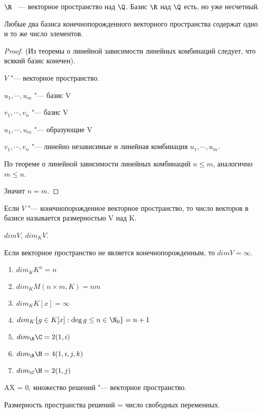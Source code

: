 \begin{exmp}
$\R$ ~--- векторное пространство над $\Q$. 
Базис $\R$ над $\Q$ есть, но уже несчетный. 
\end{exmp}

\begin{theorem}
 Любые два базиса конечнопорожденного векторного пространства содержат одно и то же
 число элементов.  
\end{theorem}

\begin{proof}
(Из теоремы о линейной зависимости линейных комбинаций следует, что всякий базис конечен).

$V$ "--- векторное пространство. 

$u_1, \cdots, u_m$ "--- базис V

$v_1, \cdots, v_n$ "--- базис V

$u_1, \cdots, u_m$ "--- образующие V

$v_1, \cdots, v_n$ "--- линейно независимые и линейная комбинация $u_1, \cdots, u_m$.

По теореме о линейной зависимости линейных комбинаций $n \le m$, аналогично $m \le n$.

Значит $n = m$.

\end{proof}

\begin{Def}
   Если $V$ "--- конечнопорожденное векторное пространство, то число векторов в базисе 
   называется размерностью V над K.

   $dim V$, $dim_K V$.

   Если векторное пространство не является конечнопорожденным, то $dim V = \infty$.
\end{Def}

\begin{exmp}
\begin{enumerate}
\item $dim_K K^n = n$
\item $dim_K M(n \times m, K) = nm$
\item $dim_K K[x] = \infty$
\item $dim_{K}\{g \in K[x]: \deg g \le n \in \N_{0}\} = n + 1$
\item $dim_{\R}\C = 2 (1, i)$
\item $dim_{\R}\H = 4 (1, i, j, k)$
\item $dim_{\C}\H = 2 (1, j)$
\end{enumerate}
\end{exmp}

AX = 0, множество решений "--- векторное пространство. 

Размерность пространства решений = число свободных переменных.

